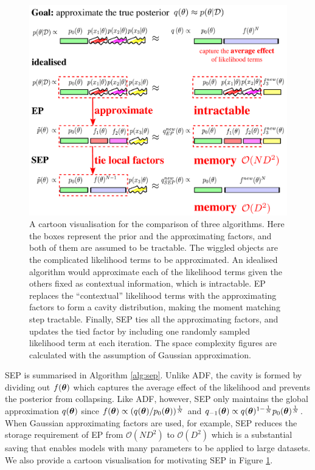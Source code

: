 \begin{figure}
\centering
\includegraphics[width=1\linewidth]{Chapter3/sep/fig/algorithm_cartoon}
\caption{A cartoon visualisation for the comparison of three algorithms. Here the boxes represent the prior and the approximating factors, and both of them are assumed to be tractable. The wiggled objects are the complicated likelihood terms to be approximated. An idealised algorithm would approximate each of the likelihood terms given the others fixed as contextual information, which is intractable. EP replaces the ``contextual'' likelihood terms with the approximating factors to form a cavity distribution, making the moment matching step tractable. Finally, SEP ties all the approximating factors, and updates the tied factor by including one randomly sampled likelihood term at each iteration. The space complexity figures are calculated with the assumption of Gaussian approximation.}
\label{fig:chap3_sep_cartoon}
\end{figure}

SEP is summarised in Algorithm \ref{alg:sep}. Unlike ADF, the cavity is formed by dividing out $f(\bm{\theta})$ which captures the average effect of the likelihood and prevents the posterior from collapsing. Like ADF, however, SEP only maintains the global approximation $q(\bm{\theta})$ since $f(\bm{\theta}) \propto (q(\bm{\theta}) / p_0(\bm{\theta}))^{\frac{1}{N}}$ and $q_{-1}(\bm{\theta}) \propto q(\bm{\theta})^{1 - \frac{1}{N}} p_0(\bm{\theta})^{\frac{1}{N}}$. When Gaussian approximating factors are used, for example, SEP reduces the storage requirement of EP from  $\mathcal{O}(ND^2)$ to $\mathcal{O}(D^2)$ which is a substantial saving that enables models with many parameters to be applied to large datasets. We also provide a cartoon visualisation for motivating SEP in Figure \ref{fig:chap3_sep_cartoon}.


%


